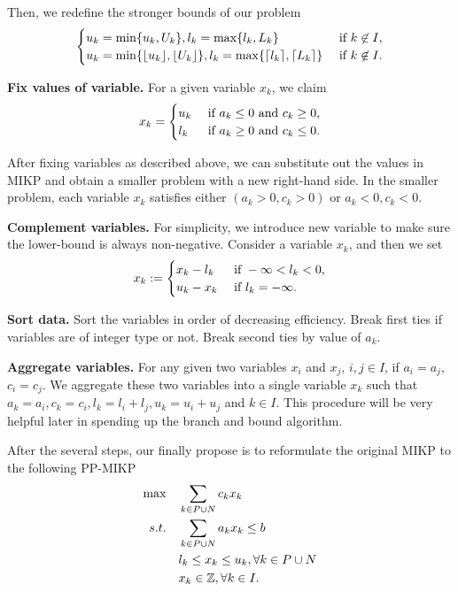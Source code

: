 \documentclass[a4paper,11pt]{article}
\begin{document}
Then, we redefine the stronger bounds of our problem
\begin{equation}
\begin{cases}
u_k=\min\{u_k, U_k\}, l_k=\max\{l_k, L_k\} & ~\mbox{if}~ k\not \in I,\\
u_k=\min\{\lfloor u_k\rfloor, \lfloor U_k \rfloor \}, l_k=\max\{\lceil l_k \rceil, \lceil L_k\rceil\} & ~\mbox{if}~ k\not \in I.\\
\end{cases}
\end{equation}

\textbf{Fix values of variable.} For a given variable $x_k$, we claim
\begin{equation}
x_k=\begin{cases}
u_k &~\mbox{if}~ a_k\leq 0 ~\mbox{and}~ c_k \geq 0,\\
l_k &~\mbox{if}~ a_k\geq 0 ~\mbox{and}~ c_k \leq 0.\\
\end{cases}
\end{equation}

After fixing variables as described above, we can substitute out the values in MIKP and obtain a smaller problem with a new right-hand side. In the smaller problem, each variable $x_k$ satisfies either $(a_k >0, c_k>0)$ or $a_k<0, c_k<0$.

\textbf{Complement variables.} For simplicity, we introduce new variable to make sure the lower-bound is always non-negative. Consider a variable $x_k$, and then we set
\begin{equation}
x_k := \begin{cases}
x_k-l_k &~\mbox{if}~ -\infty <l_k <0,\\
u_k-x_k &~\mbox{if}~ l_k = -\infty.
\end{cases}
\end{equation}

\textbf{Sort data.} Sort the variables in order of decreasing efficiency. Break first ties if variables are of integer type or not. Break second ties by value of $a_k$.

\textbf{Aggregate variables.} For any given two variables $x_i$ and $x_j$, $i,j\in I$, if $a_i=a_j$, $c_i =c_j$. We aggregate these two variables into a single variable $x_k$ such that $a_k=a_i, c_k=c_i, l_k=l_i+l_j, u_k=u_i+u_j$ and $k\in I$. This procedure will be very helpful later in spending up the branch and bound algorithm.

After the several steps, our finally propose is to reformulate the original MIKP to the following PP-MIKP
\begin{align}\label{proPP}
\max \quad & \sum_{k\in P\cup N} c_kx_k\\
s.t.\quad & \sum_{k\in P\cup N} a_kx_k \leq b\notag\\
& l_k\leq x_k \leq u_k, \forall k\in P\cup N\notag\\
&x_k\in \mathbb{Z}, \forall k\in I.\notag
\end{align}
\end{document}
